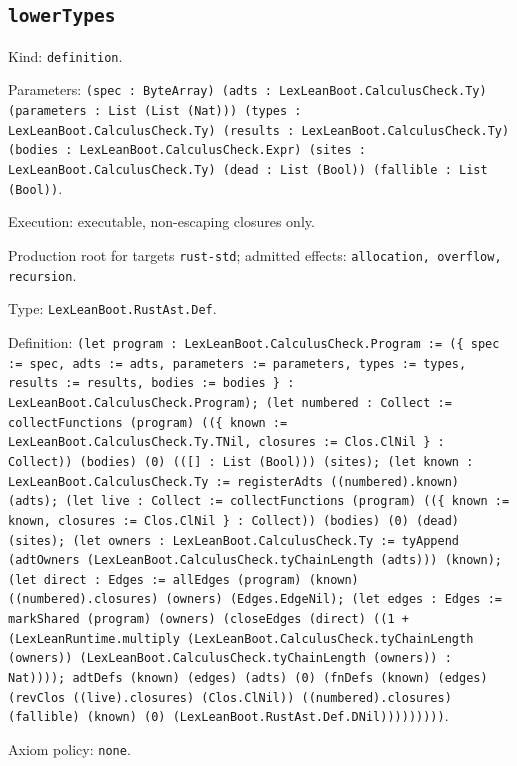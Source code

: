\documentclass[11pt]{article}
\begin{document}
\subsection*{\texttt{lowerTypes}}
\noindent Kind: \texttt{definition}.\par
\noindent Parameters: \texttt{(spec : ByteArray) (adts : LexLeanBoot.CalculusCheck.Ty) (parameters : List (List (Nat))) (types : LexLeanBoot.CalculusCheck.Ty) (results : LexLeanBoot.CalculusCheck.Ty) (bodies : LexLeanBoot.CalculusCheck.Expr) (sites : LexLeanBoot.CalculusCheck.Ty) (dead : List (Bool)) (fallible : List (Bool))}.\par
\noindent Execution: executable, non-escaping closures only.\par
\noindent Production root for targets \texttt{rust-std}; admitted effects: \texttt{allocation, overflow, recursion}.\par
\noindent Type: \texttt{LexLeanBoot.RustAst.Def}.\par
\noindent Definition: \texttt{(let program : LexLeanBoot.CalculusCheck.Program := (\{ spec := spec, adts := adts, parameters := parameters, types := types, results := results, bodies := bodies \} : LexLeanBoot.CalculusCheck.Program); (let numbered : Collect := collectFunctions (program) ((\{ known := LexLeanBoot.CalculusCheck.Ty.TNil, closures := Clos.ClNil \} : Collect)) (bodies) (0) (([] : List (Bool))) (sites); (let known : LexLeanBoot.CalculusCheck.Ty := registerAdts ((numbered).known) (adts); (let live : Collect := collectFunctions (program) ((\{ known := known, closures := Clos.ClNil \} : Collect)) (bodies) (0) (dead) (sites); (let owners : LexLeanBoot.CalculusCheck.Ty := tyAppend (adtOwners (LexLeanBoot.CalculusCheck.tyChainLength (adts))) (known); (let direct : Edges := allEdges (program) (known) ((numbered).closures) (owners) (Edges.EdgeNil); (let edges : Edges := markShared (program) (owners) (closeEdges (direct) ((1 + (LexLeanRuntime.multiply (LexLeanBoot.CalculusCheck.tyChainLength (owners)) (LexLeanBoot.CalculusCheck.tyChainLength (owners)) : Nat)))); adtDefs (known) (edges) (adts) (0) (fnDefs (known) (edges) (revClos ((live).closures) (Clos.ClNil)) ((numbered).closures) (fallible) (known) (0) (LexLeanBoot.RustAst.Def.DNil)))))))))}.\par
\noindent Axiom policy: \texttt{none}.\par
\end{document}
